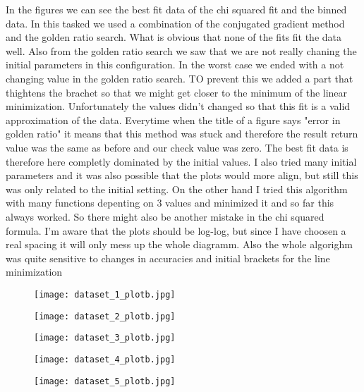 In the figures we can see the best fit data of the chi squared fit and the binned data. In this tasked we used a combination of the conjugated gradient method and the golden ratio search. What is obvious that none of the fits fit the data well. Also from the golden ratio search we saw that we are not really chaning the initial parameters in this configuration. In the worst case we ended with a not changing value in the golden ratio search. TO prevent this we added a part that thightens the brachet so that we might get closer to the minimum of the linear minimization. Unfortunately the values didn't changed so that this fit is a valid approximation of the data. Everytime when the title of a figure says "error in golden ratio" it means that this method was stuck and therefore the result return value was the same as before and our check value was zero. The best fit data is therefore here completly dominated by the initial values. I also tried many initial parameters and it was also possible that the plots would more align, but still this was only related to the initial setting. On the other hand I tried this algorithm with many functions depenting on 3 values and minimized it and so far this always worked. So there might also be another mistake in the chi squared formula. I'm aware that the plots should be log-log, but since I have choosen a real spacing it will only mess up the whole diagramm.
Also the whole algorighm was quite sensitive to changes in accuracies and initial brackets for the line minimization

\begin{figure}[h!]
    \centering
    \texttt{[image: dataset\_1\_plotb.jpg]}
\end{figure}

\begin{figure}[h!]
    \centering
    \texttt{[image: dataset\_2\_plotb.jpg]}
\end{figure}

\begin{figure}[h!]
    \centering
    \texttt{[image: dataset\_3\_plotb.jpg]}
\end{figure}

\begin{figure}[h!]
    \centering
    \texttt{[image: dataset\_4\_plotb.jpg]}
\end{figure}

\begin{figure}[h!]
    \centering
    \texttt{[image: dataset\_5\_plotb.jpg]}
\end{figure}







